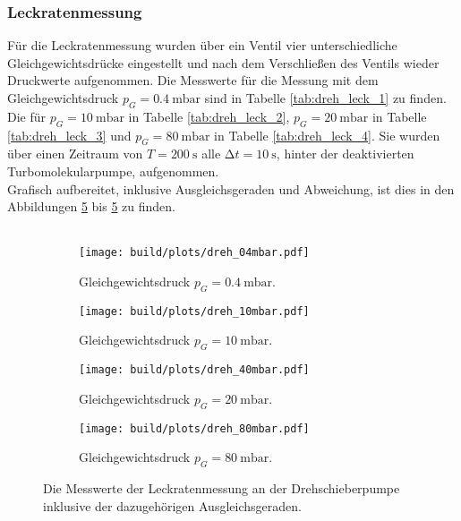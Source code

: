         \subsubsection{Leckratenmessung}

        \noindent Für die Leckratenmessung wurden über ein Ventil vier unterschiedliche Gleichgewichtsdrücke eingestellt
        und nach dem Verschließen des Ventils wieder Druckwerte aufgenommen.
        Die Messwerte für die Messung mit dem Gleichgewichtsdruck $p_G = \SI{0.4}{\milli\bar}$ sind in Tabelle \ref{tab:dreh_leck_1} zu finden.
        Die für $p_G = \SI{10}{\milli\bar}$ in Tabelle \ref{tab:dreh_leck_2}, $p_G = \SI{20}{\milli\bar}$ in Tabelle \ref{tab:dreh_leck_3} 
        und $p_G = \SI{80}{\milli\bar}$ in Tabelle \ref{tab:dreh_leck_4}.
        Sie wurden über einen Zeitraum von $ T = \SI{200}{\second}$ alle $ \increment t = \SI{10}{\second}$, hinter der deaktivierten Turbomolekularpumpe, aufgenommen.\\
        Grafisch aufbereitet, inklusive Ausgleichsgeraden und Abweichung, ist dies in den Abbildungen \ref{img:1} bis  \ref{img:1} zu finden.\\\\
        \begin{figure}[H]
            \begin{subfigure}{0.46\textwidth}
                    \centering
                    \texttt{[image: build/plots/dreh\_04mbar.pdf]}
                    \caption{Gleichgewichtsdruck $p_G = \SI{0.4}{\milli\bar}$.}
                    \label{img:dreh_leck_1}
            \end{subfigure}
            \hfill
            \begin{subfigure}{0.46\textwidth}
                    \centering
                    \texttt{[image: build/plots/dreh\_10mbar.pdf]}
                    \caption{Gleichgewichtsdruck $p_G = \SI{10}{\milli\bar}$.}
                    \label{img:dreh_leck_2}
            \end{subfigure}
            \hfill
            \begin{subfigure}{0.46\textwidth}
              \centering
              \texttt{[image: build/plots/dreh\_40mbar.pdf]}
              \caption{Gleichgewichtsdruck $p_G = \SI{20}{\milli\bar}$.}
              \label{img:dreh_leck_3}
            \end{subfigure}
            \hfill
            \begin{subfigure}{0.46\textwidth}
              \centering
              \texttt{[image: build/plots/dreh\_80mbar.pdf]}
              \caption{Gleichgewichtsdruck $p_G = \SI{80}{\milli\bar}$.}
              \label{img:dreh_leck_4}
            \end{subfigure}
            \caption{Die Messwerte der Leckratenmessung an der Drehschieberpumpe inklusive der dazugehörigen Ausgleichsgeraden.}
            \label{img:1}
        \end{figure}

